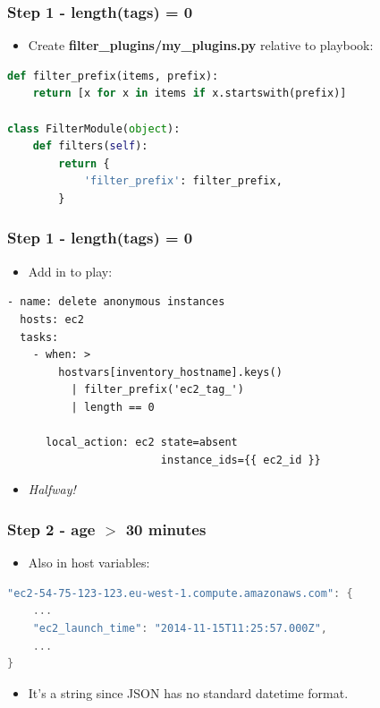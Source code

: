 \documentclass{beamer}
\begin{document}
\begin{frame}[fragile]\frametitle{Step 1 - length(tags) = 0}

    \begin{itemize}
        \item Create \textbf{filter\_plugins/my\_plugins.py} relative to playbook:
    \end{itemize}

    \begin{lstlisting}[language=Python]
def filter_prefix(items, prefix):
    return [x for x in items if x.startswith(prefix)]

class FilterModule(object):
    def filters(self):
        return {
            'filter_prefix': filter_prefix,
        }
    \end{lstlisting}

\end{frame}


\begin{frame}[fragile]\frametitle{Step 1 - length(tags) = 0}

    \begin{itemize}
        \item Add in to play:
    \end{itemize}

    \begin{lstlisting}
- name: delete anonymous instances
  hosts: ec2
  tasks:
    - when: >
        hostvars[inventory_hostname].keys()
          | filter_prefix('ec2_tag_')
          | length == 0

      local_action: ec2 state=absent
                        instance_ids={{ ec2_id }}
    \end{lstlisting}

    \begin{itemize}
        \item \textit{Halfway!}
    \end{itemize}

\end{frame}


\begin{frame}[fragile]\frametitle{Step 2 - age $>$ 30 minutes}

    \begin{itemize}
        \item Also in host variables:
    \end{itemize}

    \begin{lstlisting}[language=C]
"ec2-54-75-123-123.eu-west-1.compute.amazonaws.com": {
    ...
    "ec2_launch_time": "2014-11-15T11:25:57.000Z",
    ...
}
    \end{lstlisting}

    \begin{itemize}
        \item It's a string since JSON has no standard datetime format.
    \end{itemize}

\end{frame}
\end{document}
